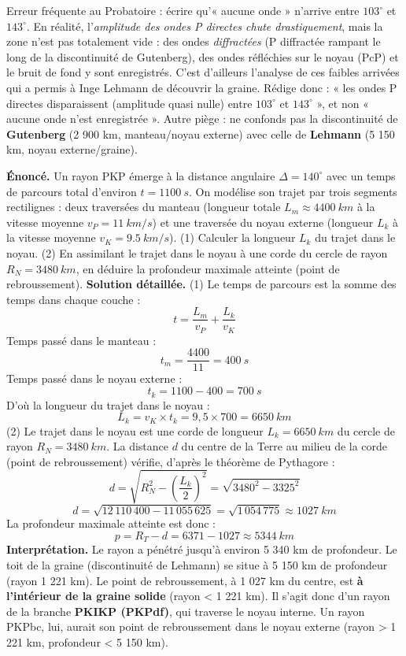 \documentclass[11pt]{article}
\begin{document}
\begin{attention}
Erreur fréquente au Probatoire : écrire qu'« aucune onde » n'arrive entre $103^{\circ}$ et $143^{\circ}$. En réalité, l'\emph{amplitude des ondes P directes chute drastiquement}, mais la zone n'est pas totalement vide : des ondes \emph{diffractées} (P diffractée rampant le long de la discontinuité de Gutenberg), des ondes réfléchies sur le noyau (PcP) et le bruit de fond y sont enregistrés. C'est d'ailleurs l'analyse de ces faibles arrivées qui a permis à Inge Lehmann de découvrir la graine. Rédige donc : « les ondes P directes disparaissent (amplitude quasi nulle) entre $103^{\circ}$ et $143^{\circ}$ », et non « aucune onde n'est enregistrée ». Autre piège : ne confonds pas la discontinuité de \textbf{Gutenberg} (2 900 km, manteau/noyau externe) avec celle de \textbf{Lehmann} (5 150 km, noyau externe/graine).
\end{attention}

\begin{exoresolu}
\textbf{Énoncé.} Un rayon PKP émerge à la distance angulaire $\Delta = 140^{\circ}$ avec un temps de parcours total d'environ $t = \SI{1100}{s}$. On modélise son trajet par trois segments rectilignes : deux traversées du manteau (longueur totale $L_m \approx \SI{4400}{km}$ à la vitesse moyenne $v_P = \SI{11}{km/s}$) et une traversée du noyau externe (longueur $L_k$ à la vitesse moyenne $v_K = \SI{9,5}{km/s}$). (1) Calculer la longueur $L_k$ du trajet dans le noyau. (2) En assimilant le trajet dans le noyau à une corde du cercle de rayon $R_N = \SI{3480}{km}$, en déduire la profondeur maximale atteinte (point de rebroussement).
\tcblower
\textbf{Solution détaillée.}
(1) Le temps de parcours est la somme des temps dans chaque couche :
\[ t = \frac{L_m}{v_P} + \frac{L_k}{v_K} \]
Temps passé dans le manteau :
\[ t_m = \frac{4400}{11} = \SI{400}{s} \]
Temps passé dans le noyau externe :
\[ t_k = 1100 - 400 = \SI{700}{s} \]
D'où la longueur du trajet dans le noyau :
\[ L_k = v_K \times t_k = 9,5 \times 700 = \SI{6650}{km} \]
(2) Le trajet dans le noyau est une corde de longueur $L_k = \SI{6650}{km}$ du cercle de rayon $R_N = \SI{3480}{km}$. La distance $d$ du centre de la Terre au milieu de la corde (point de rebroussement) vérifie, d'après le théorème de Pythagore :
\[ d = \sqrt{R_N^2 - \left(\frac{L_k}{2}\right)^2} = \sqrt{3480^2 - 3325^2} \]
\[ d = \sqrt{12\,110\,400 - 11\,055\,625} = \sqrt{1\,054\,775} \approx \SI{1027}{km} \]
La profondeur maximale atteinte est donc :
\[ p = R_T - d = 6371 - 1027 \approx \SI{5344}{km} \]
\textbf{Interprétation.} Le rayon a pénétré jusqu'à environ 5 340 km de profondeur. Le toit de la graine (discontinuité de Lehmann) se situe à 5 150 km de profondeur (rayon 1 221 km). Le point de rebroussement, à 1 027 km du centre, est \textbf{à l'intérieur de la graine solide} (rayon < 1 221 km). Il s'agit donc d'un rayon de la branche \textbf{PKIKP (PKPdf)}, qui traverse le noyau interne. Un rayon PKPbc, lui, aurait son point de rebroussement dans le noyau externe (rayon > 1 221 km, profondeur < 5 150 km).
\end{exoresolu}
\end{document}

